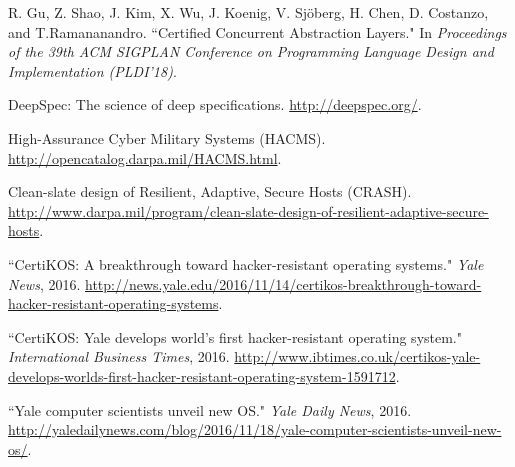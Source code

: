 \documentclass[a4paper, 10pt]{article}
\begin{document}
\begin{footnotesize}
\begin{thebibliography}{}
R. Gu, Z. Shao, J. Kim, X. Wu, J. Koenig, V. Sj\"{o}berg, H. Chen, D. Costanzo, and T.Ramananandro. ``Certified Concurrent Abstraction Layers." In \emph{Proceedings of the  39th ACM SIGPLAN Conference on Programming Language Design and Implementation (PLDI'18)}.





DeepSpec: The science of deep specifications. 
\url{http://deepspec.org/}.

High-Assurance Cyber Military Systems (HACMS). 
\url{http://opencatalog.darpa.mil/HACMS.html}.

Clean-slate design of Resilient, Adaptive, Secure Hosts (CRASH). 
\url{http://www.darpa.mil/program/clean-slate-design-of-resilient-adaptive-secure-hosts}.

``CertiKOS: A breakthrough toward hacker-resistant operating systems." \emph{Yale News}, 2016.
\url{http://news.yale.edu/2016/11/14/certikos-breakthrough-toward-hacker-resistant-operating-systems}.

``CertiKOS: Yale develops world's first hacker-resistant operating system." \emph{International Business Times}, 2016.
\url{http://www.ibtimes.co.uk/certikos-yale-develops-worlds-first-hacker-resistant-operating-system-1591712}.

``Yale computer scientists unveil new OS." \emph{Yale Daily News}, 2016.
\url{http://yaledailynews.com/blog/2016/11/18/yale-computer-scientists-unveil-new-os/}.


\begin{comment}
\bibitem[7]{sel4}
G. Klein, K. Elphinstone, G. Heiser, J. Andronick,
D. Cock, P. Derrin, D. Elkaduwe, K. Engelhardt,
R. Kolanski, M. Norrish, T. Sewell, H. Tuch, and
S. Winwood. ``seL4: Formal verification of an OS
kernel." In 22nd ACM Symposium on Operating
Systems Principles (SOSP 09).


\end{comment}
\end{thebibliography}
\end{footnotesize}
\end{document}
